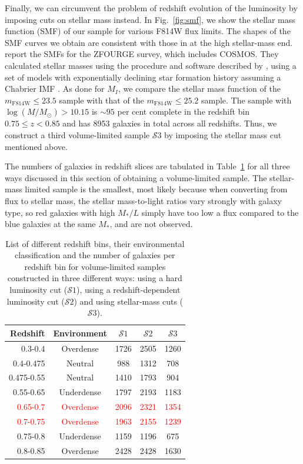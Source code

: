 \documentclass[twocolumn,useAMS,usenatbib]{mn2e}
\newcommand{\new}[1]{{\textcolor{red}{#1}}}
\newcommand{\s}{\ensuremath{\mathcal{S}}}
\begin{document}
Finally, we can circumvent the problem of redshift evolution of the
luminosity by imposing cuts on stellar mass instead. In Fig.~\ref{fig:smf}, we show the stellar mass function (SMF) of our sample for various F814W flux limits.
The shapes of the SMF curves we obtain are consistent with those in \cite{Tomczak_SMF} at the high stellar-mass end.
\cite{Tomczak_SMF} report the SMFs for the ZFOURGE survey, which
includes COSMOS. They calculated stellar masses using the procedure
and software described by \cite{2009ApJ...700..221K}, using a set of models
with exponentially declining star formation history \citep{2003MNRAS.344.1000B} assuming a
Chabrier IMF \citep{ChabrierIMF}. 
As done for $M_I$, we compare the stellar mass function of the $m_\text{F814W}\le23.5$ sample with that of the $m_\text{F814W}\le25.2$ sample. 
The sample with $\log(M/M_\odot) > 10.15$ is $\sim 95$ per cent
complete in the redshift bin $0.75 \le z< 0.85$ and has 8953
galaxies in total across all redshifts.
Thus, we construct a third volume-limited sample \s$3$ by imposing the
stellar mass cut mentioned above. 

The numbers of galaxies in redshift slices
are tabulated in Table~\ref{table:GalaxyCounts} for all three ways
discussed in this section of obtaining a volume-limited sample. The
stellar-mass limited sample is the smallest, most likely because when
converting from flux to stellar mass, the stellar mass-to-light ratios
vary strongly with galaxy type, so red galaxies with high $M_*/L$
simply have too low a flux compared to the blue galaxies at the same
$M_*$, and are not observed.

\begin{table} 
\centering
\begin{tabular}{|r|c|c|c|c|}
 \hline
 Redshift & Environment & \s$1$ & \s$2$ & \s$3$ \\
 \hline
 0.3-0.4 & Overdense & 1726 & 2505 & 1260 \\
 0.4-0.475 & Neutral & 988 & 1312 & 708 \\
 0.475-0.55 & Neutral & 1410 & 1793 & 904 \\
 0.55-0.65 & Underdense & 1797 & 2193 & 1183 \\
 \new{0.65-0.7} & \new{Overdense} & \new{2096} & \new{2321} & \new{1354} \\
 \new{0.7-0.75} & \new{Overdense} & \new{1963} & \new{2155} & \new{1239} \\
 0.75-0.8 & Underdense & 1159 & 1196 & 675 \\
 0.8-0.85 & Overdense & 2428 & 2428 & 1630 \\
 \hline
\end{tabular}
\caption{List of different redshift bins, their environmental
  classification and the number of galaxies per redshift bin for
  volume-limited samples constructed in three different ways: using a
  hard luminosity cut (\s$1$), using a redshift-dependent luminosity cut (\s$2$) and using stellar-mass cuts (\s$3$).}
\label{table:GalaxyCounts}
\end{table}
\end{document}
